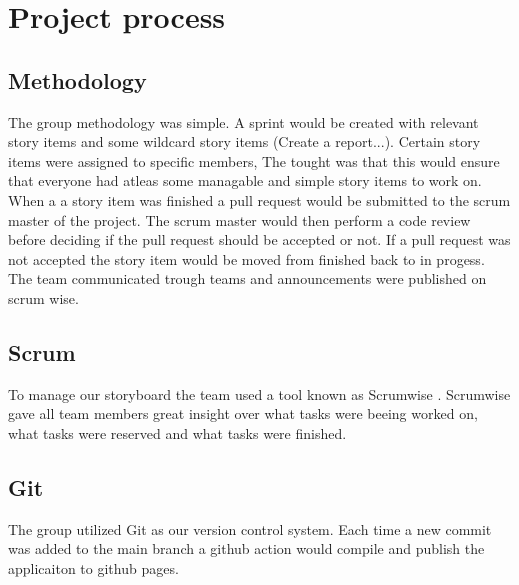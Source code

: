 \documentclass[12pt]{article}
\begin{document}
\section{Project process}
\subsection{Methodology}
The group methodology was simple. A sprint would be created with relevant story items and some wildcard story items (Create a report...).
Certain story items were assigned to specific members, The tought was that this would ensure that everyone had atleas some managable and simple story items
to work on. When a a story item was finished a pull request would be submitted to the scrum master of the project. The scrum master would then perform
a code review before deciding if the pull request should be accepted or not. If a pull request was not accepted the story item would be moved from finished back to
in progess. The team communicated trough teams and announcements were published on scrum wise. 

\subsection{Scrum}
To manage our storyboard the team used a tool known as Scrumwise \cite*{scrumwiseScrumToolsScrum}. Scrumwise gave all team members great insight over
what tasks were beeing worked on, what tasks were reserved and what tasks were finished.

\subsection{Git\cite*{Git}}
The group utilized Git as our version control system. Each time a new commit was added to the main branch a github action would compile and publish
the applicaiton to github pages.


\pagebreak
\printbibliography
\end{document}
